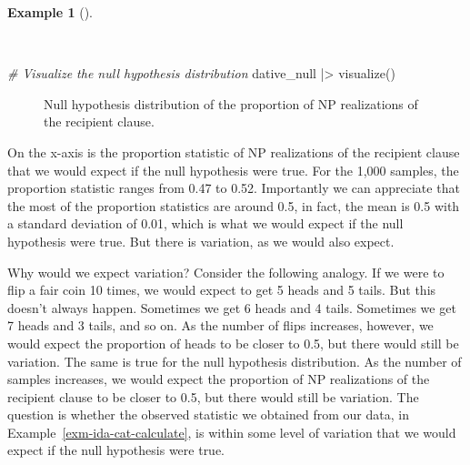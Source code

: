 \documentclass[
  letterpaper,
]{latex/krantz}
\newenvironment{Shaded}{\begin{snugshade}}{\end{snugshade}}
\newcommand{\CommentTok}[1]{\textcolor[rgb]{0.00,0.00,0.00}{\textit{#1}}}
\newcommand{\FunctionTok}[1]{\textcolor[rgb]{0.00,0.00,0.00}{#1}}
\newcommand{\NormalTok}[1]{\textcolor[rgb]{0.00,0.00,0.00}{#1}}
\newcommand{\SpecialCharTok}[1]{\textcolor[rgb]{0.00,0.00,0.00}{#1}}
\theoremstyle{definition}
\newtheorem{example}{Example}[chapter]
\theoremstyle{remark}
\begin{document}
\begin{example}[]\protect\hypertarget{exm-ida-cat-null-hypothesis}{}\label{exm-ida-cat-null-hypothesis}

~

\begin{Shaded}
\begin{Highlighting}[]
\CommentTok{\# Visualize the null hypothesis distribution}
\NormalTok{dative\_null }\SpecialCharTok{|\textgreater{}} \FunctionTok{visualize}\NormalTok{()}
\end{Highlighting}
\end{Shaded}

\begin{figure}[H]


\caption{\label{fig-ida-cat-null-hypothesis}Null hypothesis distribution
of the proportion of NP realizations of the recipient clause.}

\end{figure}%

\end{example}

On the x-axis is the proportion statistic of NP realizations of the
recipient clause that we would expect if the null hypothesis were true.
For the 1,000 samples, the proportion statistic ranges from 0.47 to
0.52. Importantly we can appreciate that the most of the proportion
statistics are around 0.5, in fact, the mean is 0.5 with a standard
deviation of 0.01, which is what we would expect if the null hypothesis
were true. But there is variation, as we would also expect.

Why would we expect variation? Consider the following analogy. If we
were to flip a fair coin 10 times, we would expect to get 5 heads and 5
tails. But this doesn't always happen. Sometimes we get 6 heads and 4
tails. Sometimes we get 7 heads and 3 tails, and so on. As the number of
flips increases, however, we would expect the proportion of heads to be
closer to 0.5, but there would still be variation. The same is true for
the null hypothesis distribution. As the number of samples increases, we
would expect the proportion of NP realizations of the recipient clause
to be closer to 0.5, but there would still be variation. The question is
whether the observed statistic we obtained from our data, in
Example~\ref{exm-ida-cat-calculate}, is within some level of variation
that we would expect if the null hypothesis were true.
\end{document}
